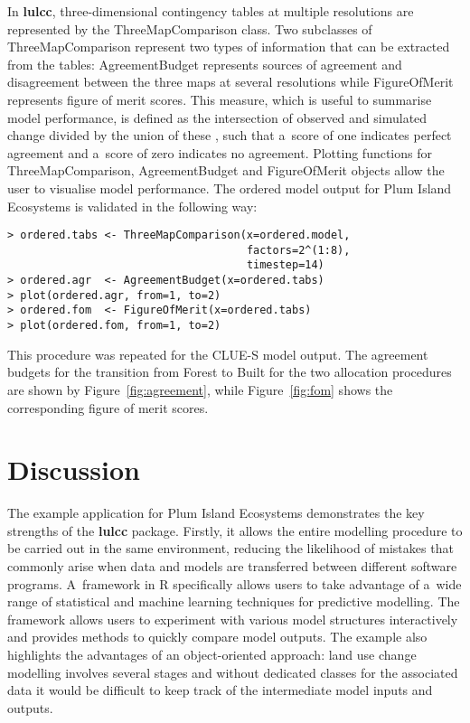 \documentclass{icldt}\usepackage[]{graphicx}\usepackage[]{color}
\begin{document}
In \textbf{lulcc}, three-dimensional contingency tables at multiple resolutions are represented by the ThreeMapComparison class. Two subclasses of ThreeMapComparison represent two types of information that can be extracted from the tables: AgreementBudget represents sources of agreement and disagreement between the three maps at several resolutions while FigureOfMerit represents figure of merit scores. This measure, which is useful to summarise model performance, is defined as the intersection of observed and simulated change divided by the union of these \citep{pontius2011}, such that a~score of one indicates perfect agreement and a~score of zero indicates no agreement. Plotting functions for ThreeMapComparison, AgreementBudget and FigureOfMerit objects allow the user to visualise model performance. The ordered model output for Plum Island Ecosystems is validated in the following way:
\begin{verbatim}
> ordered.tabs <- ThreeMapComparison(x=ordered.model, 
                                     factors=2^(1:8), 
                                     timestep=14) 
> ordered.agr  <- AgreementBudget(x=ordered.tabs) 
> plot(ordered.agr, from=1, to=2) 
> ordered.fom  <- FigureOfMerit(x=ordered.tabs) 
> plot(ordered.fom, from=1, to=2) 
\end{verbatim}
\noindent This procedure was repeated for the CLUE-S model output. The agreement budgets for the transition from Forest to Built for the two allocation procedures are shown by Figure~\ref{fig:agreement}, while Figure~\ref{fig:fom} shows the corresponding figure of merit scores. \\

\section{Discussion}

The example application for Plum Island Ecosystems demonstrates the key strengths of the \textbf{lulcc} package. Firstly, it allows the entire modelling procedure to be carried out in the same environment, reducing the likelihood of mistakes that commonly arise when data and models are transferred between different software programs. A~framework in R specifically allows users to take advantage of a~wide range of statistical and machine learning techniques for predictive modelling. The framework allows users to experiment with various model structures interactively and provides methods to quickly compare model outputs. The example also highlights the advantages of an object-oriented approach: land use change modelling involves several stages and without dedicated classes for the associated data it would be difficult to keep track of the intermediate model inputs and outputs. \\
\end{document}
